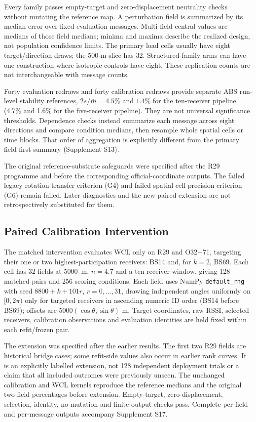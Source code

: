 \documentclass[11pt,a4paper]{article}
\begin{document}
Every family passes empty-target and zero-displacement neutrality checks without mutating the reference map. A perturbation field is summarized by its median error over fixed evaluation messages. Multi-field central values are medians of those field medians; minima and maxima describe the realized design, not population confidence limits. The primary load cells usually have eight target/direction draws; the 500-m slice has 32. Structured-family arms can have one construction where isotropic controls have eight. These replication counts are not interchangeable with message counts.

Forty evaluation redraws and forty calibration redraws provide separate ABS run-level stability references, $2s/\bar m=4.5\%$ and $1.4\%$ for the ten-receiver pipeline (4.7\% and 1.6\% for the five-receiver pipeline). They are not universal significance thresholds. Dependence checks instead summarize each message across eight directions and compare condition medians, then resample whole spatial cells or time blocks. That order of aggregation is explicitly different from the primary field-first summary (Supplement S13).

The original reference-substrate safeguards were specified after the R29 programme and before the corresponding official-coordinate outputs. The failed legacy rotation-transfer criterion (G4) and failed spatial-cell precision criterion (G6) remain failed. Later diagnostics and the new paired extension are not retrospectively substituted for them.

\subsection{Paired Calibration Intervention}\label{sec:pairedmethods}
The matched intervention evaluates WCL only on R29 and O32$-$71, targeting their one or two highest-participation receivers: BS14 and, for $k=2$, BS69. Each cell has 32 fields at 5000~m, $n=4.7$ and a ten-receiver window, giving 128 matched pairs and 256 scoring conditions. Each field uses NumPy \texttt{default\_rng} with seed $8800+k+101r$, $r=0,\ldots,31$, drawing independent angles uniformly on $[0,2\pi)$ only for targeted receivers in ascending numeric ID order (BS14 before BS69); offsets are $5000(\cos\theta,\sin\theta)$ m. Target coordinates, raw RSSI, selected receivers, calibration observations and evaluation identities are held fixed within each refit/frozen pair.

The extension was specified after the earlier results. The first two R29 fields are historical bridge cases; some refit-side values also occur in earlier rank curves. It is an explicitly labelled extension, not 128 independent deployment trials or a claim that all included outcomes were previously unseen. The unchanged calibration and WCL kernels reproduce the reference medians and the original two-field percentages before extension. Empty-target, zero-displacement, selection, identity, no-mutation and finite-output checks pass. Complete per-field and per-message outputs accompany Supplement S17.
\end{document}
